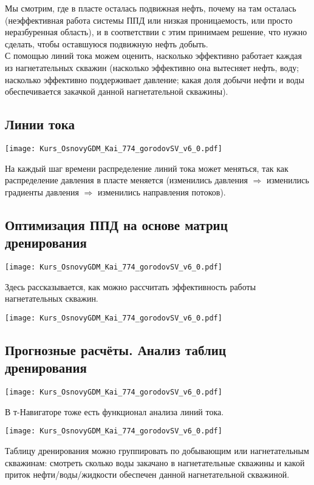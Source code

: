 \documentclass[main.tex]{subfiles}
\begin{document}
Мы смотрим, где в пласте осталась подвижная нефть, почему на там осталась (неэффективная работа системы ППД или низкая проницаемость, или просто неразбуренная область), и в соответствии с этим принимаем решение, что нужно сделать, чтобы оставшуюся подвижную нефть добыть.\\

С помощью линий тока можем оценить, насколько эффективно работает каждая из нагнетательных скважин (насколько эффективно она вытесняет нефть, воду; насколько эффективно поддерживает давление; какая доля добычи нефти и воды обеспечивается закачкой данной нагнетательной скважины).

\subsection{Линии тока}

\texttt{[image: Kurs\_OsnovyGDM\_Kai\_774\_gorodovSV\_v6\_0.pdf]}

На каждый шаг времени распределение линий тока может меняться, так как распределение давления в пласте меняется (изменились давления $\Rightarrow$ изменились градиенты давления $\Rightarrow$ изменились направления потоков).

\subsection{Оптимизация ППД на основе матриц дренирования}

\texttt{[image: Kurs\_OsnovyGDM\_Kai\_774\_gorodovSV\_v6\_0.pdf]}

Здесь рассказывается, как можно рассчитать эффективность работы нагнетательных скважин.

\texttt{[image: Kurs\_OsnovyGDM\_Kai\_774\_gorodovSV\_v6\_0.pdf]}

\subsection{Прогнозные расчёты. Анализ таблиц дренирования}

\texttt{[image: Kurs\_OsnovyGDM\_Kai\_774\_gorodovSV\_v6\_0.pdf]}

В т-Навигаторе тоже есть функционал анализа линий тока.

\texttt{[image: Kurs\_OsnovyGDM\_Kai\_774\_gorodovSV\_v6\_0.pdf]}

Таблицу дренирования можно группировать по добывающим или нагнетательным скважинам: смотреть сколько воды закачано в нагнетательные скважины и какой приток нефти/воды/жидкости обеспечен данной нагнетательной скважиной.
\\
\end{document}
